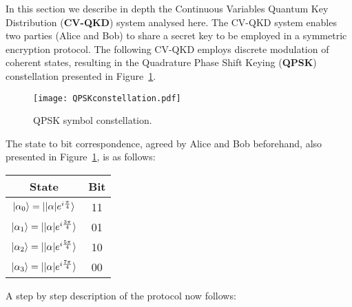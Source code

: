 In this section we describe in depth the Continuous Variables Quantum Key Distribution (\textbf{CV-QKD}) system analysed here. The CV-QKD  system enables two parties (Alice and Bob) to share a secret key to be employed in a symmetric encryption protocol. The following CV-QKD employs discrete modulation of coherent states, resulting in the Quadrature Phase Shift Keying (\textbf{QPSK}) constellation presented in Figure~\ref{fig:QPSKconst}.
\begin{figure}[h]
\centering
\texttt{[image: QPSKconstellation.pdf]}
\caption{QPSK symbol constellation.}
\label{fig:QPSKconst}
\end{figure}
The state to bit correspondence, agreed by Alice and Bob beforehand, also presented in Figure~\ref{fig:QPSKconst}, is as follows:
\begin{table}[H]
\centering
\begin{tabular}{c|c}
\textbf{State} & \textbf{Bit} \\ \hline
$\ket{\alpha_0}=\ket{|\alpha|e^{i\frac{\pi}{4}}}$ & 11 \\
$\ket{\alpha_1}=\ket{|\alpha|e^{i\frac{3\pi}{4}}}$ & 01 \\
$\ket{\alpha_2}=\ket{|\alpha|e^{i\frac{5\pi}{4}}}$ & 10 \\
$\ket{\alpha_3}=\ket{|\alpha|e^{i\frac{7\pi}{4}}}$ & 00 \\
\end{tabular}
\end{table}
A step by step description of the protocol now follows:
